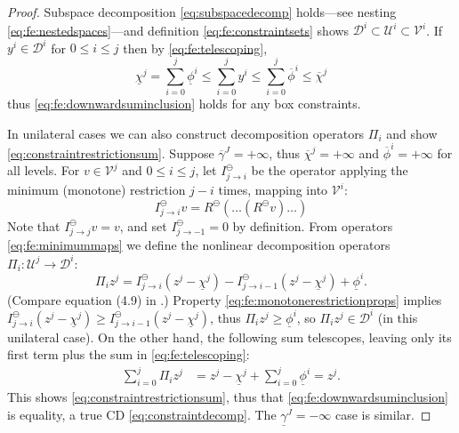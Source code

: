 \documentclass[letterpaper,final,12pt,reqno]{amsart}
\theoremstyle{cstyle}
\theoremstyle{cstyle*}
\theoremstyle{dstyle}
\numberwithin{equation}{section}
\numberwithin{figure}{section}
\numberwithin{table}{section}
\numberwithin{theorem}{section}
\newcommand{\cV}{\mathcal{V}}
\newcommand{\minR}{R^{\bm{\ominus}}}
\begin{document}
\begin{proof}  Subspace decomposition \eqref{eq:subspacedecomp} holds---see nesting \eqref{eq:fe:nestedspaces}---and definition \eqref{eq:fe:constraintsets} shows $\mathcal{D}^i \subset \mathcal{U}^i \subset \cV^i$.  If $y^i \in \mathcal{D}^i$ for $0 \le i \le j$ then by \eqref{eq:fe:telescoping},
\begin{equation}
\underline{\chi}^j = \sum_{i=0}^j \underline{\phi}^i \le \sum_{i=0}^j y^i \le \sum_{i=0}^j \overline{\phi}^i \le \overline{\chi}^j \label{eq:fe:lemmaordering}
\end{equation}
thus \eqref{eq:fe:downwardsuminclusion} holds for any box constraints.

In unilateral cases we can also construct decomposition operators $\Pi_i$ and show \eqref{eq:constraintrestrictionsum}.  Suppose $\overline{\gamma}^J=+\infty$, thus $\overline{\chi}^j=+\infty$ and $\overline{\phi}^i = +\infty$ for all levels.  For $v\in \mathcal{V}^j$ and $0\le i \le j$, let $I_{j\to i}^\ominus$ be the operator applying the minimum (monotone) restriction $j-i$ times, mapping into $\mathcal{V}^i$:
\begin{equation}
I_{j\to i}^\ominus v = \minR(\dots(\minR v)\dots)  \label{eq:fe:minimummaps}
\end{equation}
Note that $I_{j\to j}^\ominus v = v$, and set $I_{j\to -1}^\ominus=0$ by definition.  From operators \eqref{eq:fe:minimummaps} we define the nonlinear decomposition operators $\Pi_i:\mathcal{U}^j \to \mathcal{D}^i$:
\begin{equation}
\Pi_i z^j = I_{j\to i}^\ominus(z^j - \underline{\chi}^j) - I_{j\to i-1}^\ominus(z^j - \underline{\chi}^j) + \underline{\phi}^i.  \label{eq:fe:unilateraldecompositionoperator}
\end{equation}
(Compare equation (4.9) in \cite{GraeserKornhuber2009}.)  Property \eqref{eq:fe:monotonerestrictionprops} implies $I_{j\to i}^\ominus(z^j - \underline{\chi}^j) \ge I_{j\to i-1}^\ominus(z^j - \underline{\chi}^j)$, thus $\Pi_i z^j \ge \underline{\phi}^i$, so $\Pi_i z^j \in \mathcal{D}^i$ (in this unilateral case).  On the other hand, the following sum telescopes, leaving only its first term plus the sum in \eqref{eq:fe:telescoping}:
\begin{align*}
\sum_{i=0}^j \Pi_i z^j &= z^j - \underline{\chi}^j + \sum_{i=0}^j \underline{\phi}^i = z^j.
\end{align*}
This shows \eqref{eq:constraintrestrictionsum}, thus that \eqref{eq:fe:downwardsuminclusion} is equality, a true CD \eqref{eq:constraintdecomp}.  The $\underline{\gamma}^J=-\infty$ case is similar.
\end{proof}
\end{document}
